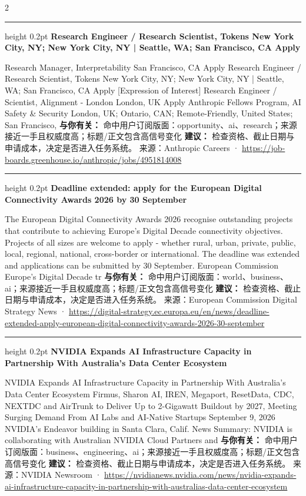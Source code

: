 \documentclass[10.5pt]{ctexart}
\begin{document}
\begin{multicols}{2}
\hrule height 0.2pt
\vspace{2mm}
{\large\bfseries Research Engineer / Research Scientist, Tokens New York City, NY; New York City, NY | Seattle, WA; San Francisco, CA Apply}\par
[Expression of Interest] Research Manager, Interpretability San Francisco, CA Apply Research Engineer / Research Scientist, Tokens New York City, NY; New York City, NY | Seattle, WA; San Francisco, CA Apply [Expression of Interest] Research Engineer / Scientist, Alignment - London London, UK Apply Anthropic Fellows Program, AI Safety \& Security London, UK; Ontario, CAN; Remote-Friendly, United States; San Francisco, 
\textbf{与你有关：} 命中用户订阅版面：opportunity、ai、research；来源接近一手且权威度高；标题/正文包含高信号变化
\textbf{建议：} 检查资格、截止日期与申请成本，决定是否进入任务系统。
{\footnotesize\color{ormuted} 来源：Anthropic Careers · \url{https://job-boards.greenhouse.io/anthropic/jobs/4951814008}}
\vspace{2mm}
\hrule height 0.2pt
\vspace{2mm}
{\large\bfseries Deadline extended: apply for the European Digital Connectivity Awards 2026 by 30 September}\par
The European Digital Connectivity Awards 2026 recognise outstanding projects that contribute to achieving Europe’s Digital Decade connectivity objectives. Projects of all sizes are welcome to apply - whether rural, urban, private, public, local, regional, national, cross-border or international. The deadline was extended and applications can be submitted by 30 September. European Commission Europe’s Digital Decade tr
\textbf{与你有关：} 命中用户订阅版面：world、business、ai；来源接近一手且权威度高；标题/正文包含高信号变化
\textbf{建议：} 检查资格、截止日期与申请成本，决定是否进入任务系统。
{\footnotesize\color{ormuted} 来源：European Commission Digital Strategy News · \url{https://digital-strategy.ec.europa.eu/en/news/deadline-extended-apply-european-digital-connectivity-awards-2026-30-september}}
\vspace{2mm}
\hrule height 0.2pt
\vspace{2mm}
{\large\bfseries NVIDIA Expands AI Infrastructure Capacity in Partnership With Australia’s Data Center Ecosystem}\par
NVIDIA Expands AI Infrastructure Capacity in Partnership With Australia’s Data Center Ecosystem Firmus, Sharon AI, IREN, Megaport, ResetData, CDC, NEXTDC and AirTrunk to Deliver Up to 2-Gigawatt Buildout by 2027, Meeting Surging Demand From AI Labs and AI-Native Startups September 9, 2026 NVIDIA's Endeavor building in Santa Clara, Calif. News Summary: NVIDIA is collaborating with Australian NVIDIA Cloud Partners and 
\textbf{与你有关：} 命中用户订阅版面：business、engineering、ai；来源接近一手且权威度高；标题/正文包含高信号变化
\textbf{建议：} 检查资格、截止日期与申请成本，决定是否进入任务系统。
{\footnotesize\color{ormuted} 来源：NVIDIA Newsroom · \url{https://nvidianews.nvidia.com/news/nvidia-expands-ai-infrastructure-capacity-in-partnership-with-australias-data-center-ecosystem}}
\end{multicols}
\end{document}
